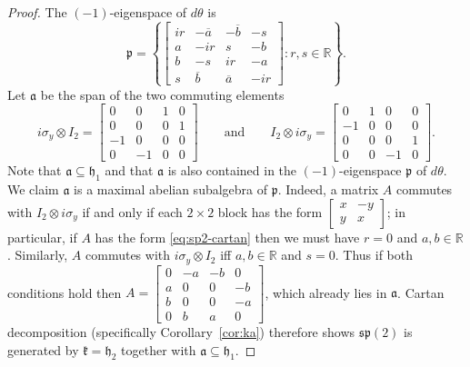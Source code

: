 \documentclass[reqno]{amsart}
\theoremstyle{definition} \newtheorem{example}[theorem]{Example}
\newcommand{\RR}{\mathbb{R}}
\renewcommand{\sp}{\mathfrak{sp}}
\newcommand{\p}{\mathfrak{p}}
\newcommand{\h}{\mathfrak{h}}
\renewcommand{\k}{\mathfrak{k}}
\renewcommand{\a}{\mathfrak{a}}
\begin{document}
\begin{proof}
The $(-1)$-eigenspace of $d\theta$ is
\begin{equation} \label{eq:sp2-cartan}
\p = \left\{ \left[ \begin{smallmatrix}
ir & -\overline{a} & -\overline{b} & -s\\
a &  -ir 		  & s   & -b\\
b & -s  & ir & -a\\
s & \overline{b}   & \overline{a}  & -ir
\end{smallmatrix}\right] : r,s \in \RR \right\}.
\end{equation}
Let $\a$ be the span of the two commuting elements
\begin{equation*}
i\sigma_y \otimes I_2 = \left[ \begin{smallmatrix}
0 & 0 & 1 & 0\\
0 & 0 & 0 & 1\\
-1 &0 & 0 & 0\\
0 & -1 & 0 & 0
\end{smallmatrix} \right] \qquad \text{and} \qquad I_2 \otimes i\sigma_y = \left[ \begin{smallmatrix}
0 & 1 & 0 & 0\\
-1 & 0 & 0 & 0\\
0 & 0 & 0 & 1\\
0 & 0 & -1 & 0
\end{smallmatrix} \right].
\end{equation*}
Note that $\a \subseteq \h_1$ and that $\a$ is also contained in the $(-1)$-eigenspace $\p$ of $d\theta$. We claim $\a$ is a maximal abelian subalgebra of $\p$. Indeed, a matrix $A$ commutes with $I_2 \otimes i\sigma_y$ if and only if each $2 \times 2$ block has the form $\left[ \begin{smallmatrix} x & -y \\ y & x \end{smallmatrix} \right]$; in particular, if $A$ has the form \eqref{eq:sp2-cartan} then we must have $r = 0$ and $a,b \in \RR$. Similarly, $A$ commutes with $i\sigma_y \otimes I_2$ iff $a,b \in \RR$ and $s = 0$. Thus if both conditions hold then $A =  \left[ \begin{smallmatrix}
0 & -a & -b & 0\\
a &  0 		  & 0   & -b\\
b & 0  & 0 & -a\\
0 & b   & a  & 0
\end{smallmatrix}\right]$, which already lies in $\a$. Cartan decomposition (specifically Corollary~\ref{cor:ka}) therefore shows $\sp(2)$ is generated by $\k = \h_2$ together with $\a \subseteq \h_1$.
\end{proof}
\end{document}
